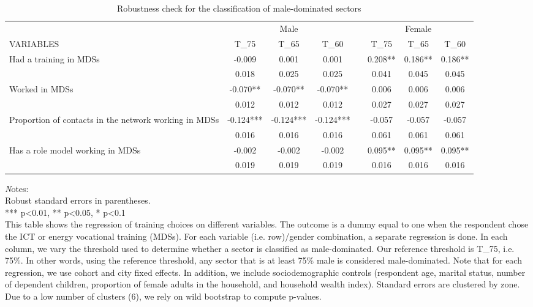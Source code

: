 \begin{landscape}
\begin{table}[]
\caption{Robustness check for the classification of male-dominated sectors}
\label{tab:MDS_reg_robustness}
\begin{tabular}{@{}lccccccc@{}}
\toprule
& \multicolumn{3}{c}{Male}        &  & \multicolumn{3}{c}{Female}     \\ \cmidrule(lr){2-4}  \cmidrule(l){6-8}
VARIABLES  & T\_75    & T\_65     & T\_60    &  & T\_75    & T\_65    & T\_60    \\ \midrule
Had a training in MDSs&   -0.009&    0.001&    0.001&&    0.208**&    0.186**&    0.186**\\
&    0.018&    0.025&    0.025&&    0.041&    0.045&    0.045\\
Worked in MDSs&   -0.070**&   -0.070**&   -0.070**&&    0.006&    0.006&    0.006\\
&    0.012&    0.012&    0.012&&    0.027&    0.027&    0.027\\
Proportion of contacts in the network working in MDSs&   -0.124***&   -0.124***&   -0.124***&&   -0.057&   -0.057&   -0.057\\
&    0.016&    0.016&    0.016&&    0.061&    0.061&    0.061\\
Has a role model working in MDSs&   -0.002&   -0.002&   -0.002&&    0.095**&    0.095**&    0.095**\\
&    0.019&    0.019&    0.019&&    0.016&    0.016&    0.016\\
\midrule
\end{tabular}
\begin{minipage}{21cm}
\small{
{\textit Notes:} \\
Robust standard errors in parentheses. \\
*** p\textless{}0.01, ** p\textless{}0.05, * p\textless{}0.1 \\
This table shows the regression of training choices on different variables. The outcome is a dummy equal to one when the respondent chose the ICT or energy vocational training (MDSs). For each variable (i.e. row)/gender combination, a separate regression is done. In each column, we vary the threshold used to determine whether a sector is classified as male-dominated.  Our reference threshold is T\_75, i.e. 75\%. In other words, using the reference threshold, any sector that is at least 75\% male is considered male-dominated. Note that for each regression, we use cohort and city fixed effects. In addition, we include sociodemographic controls (respondent age, marital status, number of dependent children, proportion of female adults in the household, and household wealth index). Standard errors are clustered by zone. Due to a low number of clusters (6), we rely on wild bootstrap to compute p-values.
}
\end{minipage}
\end{table}
\end{landscape}
